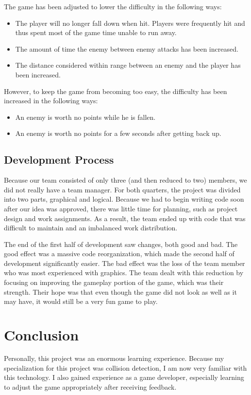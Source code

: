 \documentclass{article}
\begin{document}
The game has been adjusted to lower the difficulty in the following ways:
\begin{itemize}
  \item The player will no longer fall down when hit. Players were frequently hit and thus spent most of the game time unable to run away.
  \item The amount of time the enemy between enemy attacks has been increased.
  \item The distance considered within range between an enemy and the player has been increased.
\end{itemize}

However, to keep the game from becoming too easy, the difficulty has been increased in the following ways:
\begin{itemize}
  \item An enemy is worth no points while he is fallen.
  \item An enemy is worth no points for a few seconds after getting back up.
\end{itemize}

\subsection{Development Process}
Because our team consisted of only three (and then reduced to two) members, we did not really have a team manager. For both quarters, the project was divided into two parts, graphical and logical. Because we had to begin writing code soon after our idea was approved, there was little time for planning, such as project design and work assignments. As a result, the team ended up with code that was difficult to maintain and an imbalanced work distribution.

The end of the first half of development saw changes, both good and bad. The good effect was a massive code reorganization, which made the second half of development significantly easier. The bad effect was the loss of the team member who was most experienced with graphics. The team dealt with this reduction by focusing on improving the gameplay portion of the game, which was their strength. Their hope was that even though the game did not look as well as it may have, it would still be a very fun game to play.

\section{Conclusion}
Personally, this project was an enormous learning experience. Because my specialization for this project was collision detection, I am now very familiar with this technology. I also gained experience as a game developer, especially learning to adjust the game appropriately after receiving feedback.
\end{document}
